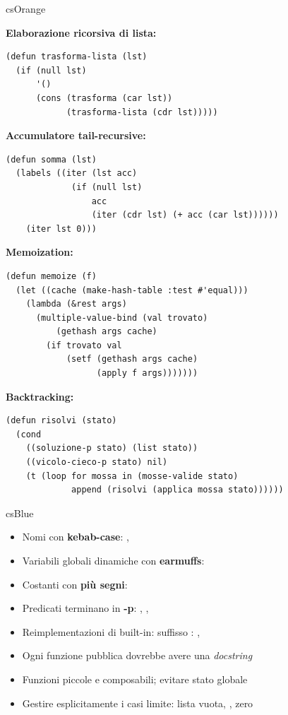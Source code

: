 \begin{refbox}{csOrange}
\label{sec:pattern}

\textbf{Elaborazione ricorsiva di lista:}\nopagebreak
\begin{lstlisting}
(defun trasforma-lista (lst)
  (if (null lst)
      '()
      (cons (trasforma (car lst))
            (trasforma-lista (cdr lst)))))
\end{lstlisting}

\textbf{Accumulatore tail-recursive:}\nopagebreak
\begin{lstlisting}
(defun somma (lst)
  (labels ((iter (lst acc)
             (if (null lst)
                 acc
                 (iter (cdr lst) (+ acc (car lst))))))
    (iter lst 0)))
\end{lstlisting}

\textbf{Memoization:}\nopagebreak
\begin{lstlisting}
(defun memoize (f)
  (let ((cache (make-hash-table :test #'equal)))
    (lambda (&rest args)
      (multiple-value-bind (val trovato)
          (gethash args cache)
        (if trovato val
            (setf (gethash args cache)
                  (apply f args)))))))
\end{lstlisting}

\textbf{Backtracking:}\nopagebreak
\begin{lstlisting}
(defun risolvi (stato)
  (cond
    ((soluzione-p stato) (list stato))
    ((vicolo-cieco-p stato) nil)
    (t (loop for mossa in (mosse-valide stato)
             append (risolvi (applica mossa stato))))))
\end{lstlisting}

\end{refbox}

\begin{refbox}{csBlue}
\label{sec:stile}

\begin{itemize}[leftmargin=1.5em, itemsep=3pt]
  \item Nomi con \textbf{kebab-case}: , 
  \item Variabili globali dinamiche con \textbf{earmuffs}: 
  \item Costanti con \textbf{più segni}: 
  \item Predicati terminano in \textbf{-p}: , , 
  \item Reimplementazioni di built-in: suffisso \fn{*}: , 
  \item Ogni funzione pubblica dovrebbe avere una \textit{docstring}
  \item Funzioni piccole e composabili; evitare stato globale
  \item Gestire esplicitamente i casi limite: lista vuota, , zero
\end{itemize}

\end{refbox}

